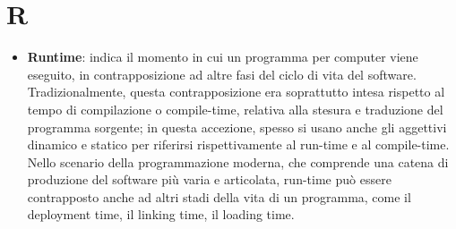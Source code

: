 \section{R}
\begin{itemize} 
\item
\textbf{Runtime}: indica il momento in cui un programma per computer viene eseguito, in contrapposizione ad altre fasi del ciclo di vita del software.
Tradizionalmente, questa contrapposizione era soprattutto intesa rispetto al tempo di compilazione o compile-time, relativa alla stesura e traduzione del programma sorgente; in questa accezione, spesso si usano anche gli aggettivi dinamico e statico per riferirsi rispettivamente al run-time e al compile-time. Nello scenario della programmazione moderna, che comprende una catena di produzione del software più varia e articolata, run-time può essere contrapposto anche ad altri stadi della vita di un programma, come il deployment time, il linking time, il loading time.
\end{itemize}